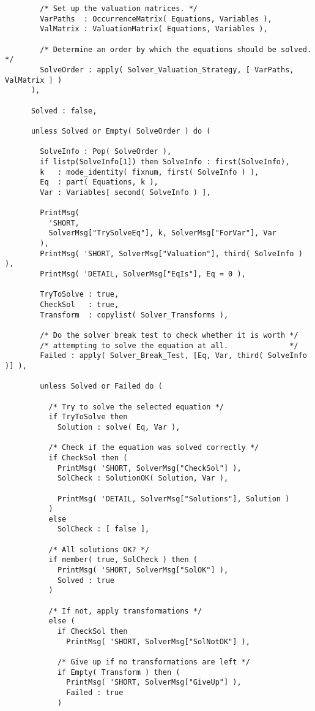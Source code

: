 \begin{verbatim}
        /* Set up the valuation matrices. */
        VarPaths  : OccurrenceMatrix( Equations, Variables ),
        ValMatrix : ValuationMatrix( Equations, Variables ),

        /* Determine an order by which the equations should be solved. */
        SolveOrder : apply( Solver_Valuation_Strategy, [ VarPaths, ValMatrix ] )
      ),

      Solved : false,

      unless Solved or Empty( SolveOrder ) do (

        SolveInfo : Pop( SolveOrder ),
        if listp(SolveInfo[1]) then SolveInfo : first(SolveInfo),
        k   : mode_identity( fixnum, first( SolveInfo ) ),
        Eq  : part( Equations, k ),
        Var : Variables[ second( SolveInfo ) ],

        PrintMsg( 
          'SHORT, 
          SolverMsg["TrySolveEq"], k, SolverMsg["ForVar"], Var 
        ),
        PrintMsg( 'SHORT, SolverMsg["Valuation"], third( SolveInfo ) ),
        PrintMsg( 'DETAIL, SolverMsg["EqIs"], Eq = 0 ),

        TryToSolve : true,
        CheckSol   : true,
        Transform  : copylist( Solver_Transforms ),

        /* Do the solver break test to check whether it is worth */
        /* attempting to solve the equation at all.              */
        Failed : apply( Solver_Break_Test, [Eq, Var, third( SolveInfo )] ),
        
        unless Solved or Failed do (

          /* Try to solve the selected equation */
          if TryToSolve then
            Solution : solve( Eq, Var ),

          /* Check if the equation was solved correctly */
          if CheckSol then (
            PrintMsg( 'SHORT, SolverMsg["CheckSol"] ),
            SolCheck : SolutionOK( Solution, Var ),

            PrintMsg( 'DETAIL, SolverMsg["Solutions"], Solution )
          )
          else
            SolCheck : [ false ],

          /* All solutions OK? */
          if member( true, SolCheck ) then (
            PrintMsg( 'SHORT, SolverMsg["SolOK"] ),
            Solved : true
          )

          /* If not, apply transformations */
          else (
            if CheckSol then
              PrintMsg( 'SHORT, SolverMsg["SolNotOK"] ),

            /* Give up if no transformations are left */
            if Empty( Transform ) then (
              PrintMsg( 'SHORT, SolverMsg["GiveUp"] ),
              Failed : true
            )


\end{verbatim}
